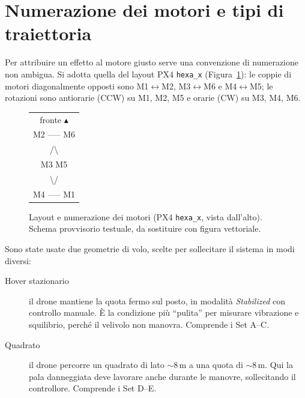\section{Numerazione dei motori e tipi di traiettoria}

Per attribuire un effetto al motore giusto serve una convenzione di numerazione
non ambigua. Si adotta quella del layout PX4 \texttt{hexa\_x}
(Figura~\ref{fig:mappa-motori}): le coppie di motori diagonalmente opposti sono
M1$\leftrightarrow$M2, M3$\leftrightarrow$M6 e M4$\leftrightarrow$M5; le rotazioni
sono antiorarie (CCW) su M1, M2, M5 e orarie (CW) su M3, M4, M6.

\begin{figure}[H]
\centering
\begin{minipage}{0.62\linewidth}
\centering
\ttfamily\small
\begin{tabular}{c}
fronte $\blacktriangle$ \\[2pt]
M2 ----- M6 \\
/\hspace{3.2cm}\textbackslash \\
M3 \hspace{2.6cm} M5 \\
\textbackslash\hspace{3.2cm}/ \\
M4 ----- M1 \\
\end{tabular}
\end{minipage}
\caption{Layout e numerazione dei motori (PX4 \texttt{hexa\_x}, vista
dall'alto). Schema provvisorio testuale, da sostituire con figura vettoriale.}
\label{fig:mappa-motori}
\end{figure}

Sono state usate due geometrie di volo, scelte per sollecitare il sistema in modi
diversi:

\begin{description}
  \item[Hover stazionario] il drone mantiene la quota fermo sul posto, in
        modalit\`a \emph{Stabilized} con controllo manuale. \`E la condizione pi\`u
        \enquote{pulita} per misurare vibrazione e squilibrio, perch\'e il velivolo
        non manovra. Comprende i Set A--C.
  \item[Quadrato] il drone percorre un quadrato di lato $\sim$8\,m a una quota di
        $\sim$8\,m. Qui la pala danneggiata deve lavorare anche durante le
        manovre, sollecitando il controllore. Comprende i Set D--E.
\end{description}

